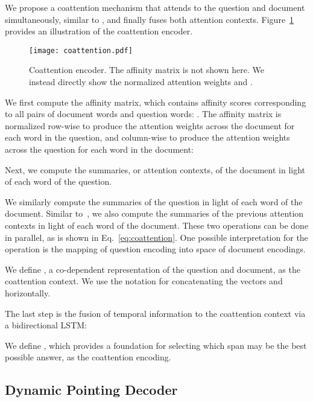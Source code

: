 \documentclass{article} \usepackage{iclr2017_conference,times}
\begin{document}
We propose a coattention mechanism that attends to the question and document simultaneously, similar to \citep{lu2016hierarchical}, and finally fuses both attention contexts.
Figure~\ref{fig:encoder} provides an illustration of the coattention encoder.

\begin{figure}[!t]
    \centering
	\texttt{[image: coattention.pdf]}
    \vspace{-0.5cm}
	\caption{Coattention encoder. The affinity matrix  is not shown here. We instead directly show the normalized attention weights  and .}
	\label{fig:encoder}
\end{figure}

We first compute the affinity matrix, which contains affinity scores corresponding to all pairs of document words and question words:
.
The affinity matrix is normalized row-wise to produce the attention weights  across the document for each word in the question, and column-wise to produce the attention weights  across the question for each word in the document:



Next, we compute the summaries, or attention contexts, of the document in light of each word of the question. 

We similarly compute the summaries  of the question in light of each word of the document.
Similar to~\citet{cui2016attention}, we also compute the summaries  of the previous attention contexts in light of each word of the document.
These two operations can be done in parallel, as is shown in Eq.~\ref{eq:coattention}.
One possible interpretation for the operation  is the mapping of question encoding into space of document encodings.


We define , a co-dependent representation of the question and document, as the coattention context.
We use the notation  for concatenating the vectors  and  horizontally.

The last step is the fusion of temporal information to the coattention context via a bidirectional LSTM:

We define  , which provides a foundation for selecting which span may be the best possible answer, as the coattention encoding.



\subsection{Dynamic Pointing Decoder}
\end{document}
